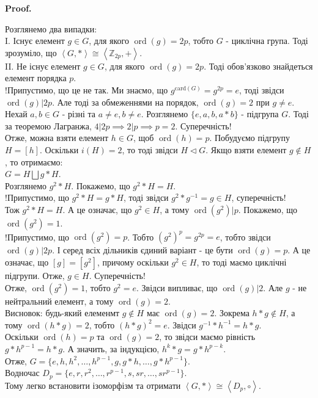 \documentclass[a4paper, 10pt]{article}
\makeatletter
\theoremstyle{theoremdd}
\theoremstyle{theoremdd}
\theoremstyle{theoremdd}
\theoremstyle{theoremdd}
\theoremstyle{theoremdd}
\theoremstyle{theoremdd}
\theoremstyle{theoremdd}
\theoremstyle{theoremdd}
\theoremstyle{theoremdd}
\theoremstyle{theoremdd}
\theoremstyle{theoremdd}
\theoremstyle{theoremdd}
\theoremstyle{theoremdd}
\theoremstyle{theoremdd}
\theoremstyle{theoremdd}
\renewenvironment{proof}[1][Proof.\\]{\par
\pushQED{\hfill \qed}%
\normalfont \topsep6\p@\@plus6\p@\relax
\trivlist
\item\relax
{\bfseries
#1\@addpunct{.}}\hspace\labelsep\ignorespaces
}{%
\popQED\endtrivlist\@endpefalse
}
\DeclareMathOperator{\ord}{ord}
\makeatother
\begin{document}
\begin{proof}
Розглянемо два випадки:\\
I. Існує елемент $g \in G$, для якого $\ord (g) = 2p$, тобто $G$ - циклічна група. Тоді зрозуміло, що $\left< G, * \right> \cong \left< \mathbb{Z}_{2p},+ \right>$.
\bigskip \\
II. Не існує елемент $g \in G$, для якого $\ord(g) = 2p$. Тоді обов'язково знайдеться елемент порядка $p$.\\
!Припустимо, що це не так. Ми знаємо, що $g^{\text{card}(G)} = g^{2p} = e$, тоді звідси $\ord(g) | 2p$. Але тоді за обмеженнями на порядок, $\ord(g) = 2$ при $g \neq e$.\\
Нехай $a,b \in G$ - різні та $a \neq e, b \neq e$. Розглянемо $\{e,a,b,a*b\}$ - підгрупа $G$. Тоді за теоремою Лагранжа, $4 | 2p \implies 2 | p \implies p = 2$. Суперечність!\\
Отже, можна взяти елемент $h \in G$, щоб $\ord(h) = p$. Побудуємо підгрупу $H = [h]$. Оскільки $i(H) = 2$, то тоді звідси $H \triangleleft G$. Якщо взяти елемент $g \not\in H$, то отримаємо:\\
$G = H \bigsqcup g*H$.\\
Розглянемо $g^2 * H$. Покажемо, що $g^2 * H = H$.\\
!Припустимо, що $g^2 * H = g * H$, тоді звідси $g^2 * g^{-1} = g \in H$, суперечність!\\
Тож $g^2 * H = H$. А це означає, що $g^2 \in H$, а тому $\ord(g^2) | p$. Покажемо, що $\ord(g^2) = 1$.\\
!Припустимо, що $\ord(g^2) = p$. Тобто $(g^{2})^p = g^{2p} = e$, тобто звідси $\ord(g) | 2p$. І серед всіх дільників єдиний варіант - це бути $\ord(g) = p$. А це означає, що $[g] = [g^2]$, причому оскільки $g^2 \in H$, то тоді маємо циклічні підгрупи. Отже, $g \in H$. Суперечність!\\
Отже, $\ord(g^2) = 1$, тобто $g^2 = e$. Звідси випливає, що $\ord(g) | 2$. Але $g$ - не нейтральний елемент, а тому $\ord(g) = 2$.\\
Висновок: будь-який елеменмт $g \not \in H$ має $\ord(g) = 2$. Зокрема $h*g \not\in H$, а тому $\ord(h*g) = 2$, тобто $(h*g)^2 = e$. Звідси $g^{-1}*h^{-1} = h*g$.\\
Оскільки $\ord(h) = p$ та $\ord(g) = 2$, то звідси маємо рівність $g*h^{p-1} = h*g$. А значить, за індукцією, $h^k*g = g *h^{p-k}$.\\
Отже, $G = \{e,h,h^2,\dots,h^{p-1}, g, g*h, \dots, g*h^{p-1}\}$.\\
Водночас $D_p = \{e,r,r^2,\dots,r^{p-1},s, sr, \dots, sr^{p-1}\}$.\\
Тому легко встановити ізоморфізм та отримати $\left<G,* \right> \cong \left< D_p, \circ \right>$.
\end{proof}
\end{document}

